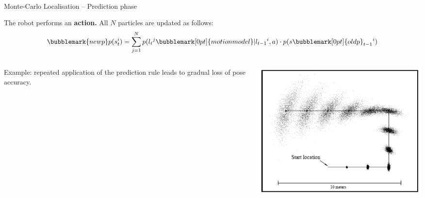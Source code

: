 \documentclass[compress]{beamer}
\begin{document}
\begin{frame}{Monte-Carlo Localisation -- Prediction phase}

The robot performs an \textbf{action.} All $N$ particles are
    updated as follows:
    \Large
        \[ 
        \bubblemark{newp}p(s_t^i) = \sum_{j=1}^N
        p(l_t{}^j\bubblemark[0pt]{motionmodel}|l_{t-1}{}^i, a) \cdot p(s\bubblemark[0pt]{oldp}_{t-1}{}^i)
        \]
    \normalsize
    \begin{columns}
        \begin{column}{0.5\linewidth}
Example: repeated application of the prediction rule leads to gradual
  loss of pose accuracy.
        \end{column}
        \begin{column}{0.5\linewidth}
            \begin{center}
                \includegraphics[width=\linewidth]{mcl_prediction}
            \end{center}
        \end{column}
    \end{columns}




\end{frame}
\end{document}
